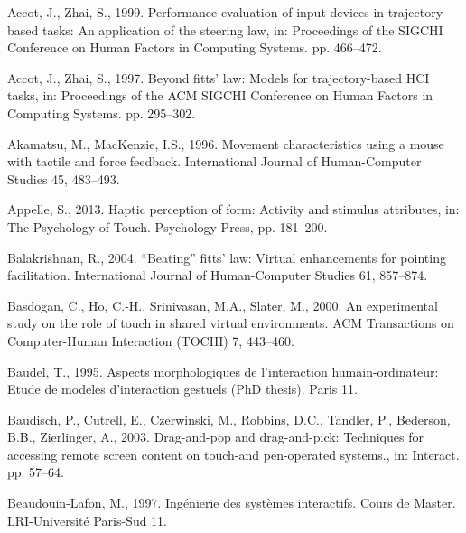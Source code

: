 \documentclass[
]{book}
\newlength{\cslhangindent}
\newlength{\cslentryspacingunit} %
\newenvironment{CSLReferences}[2] %
 {%
  \setlength{\parindent}{0pt}
  \ifodd #1
  \let\oldpar\par
  \def\par{\hangindent=\cslhangindent\oldpar}
  \fi
  \setlength{\parskip}{#2\cslentryspacingunit}
 }%
 {}
\begin{document}
\hypertarget{refs}{}
\begin{CSLReferences}{1}{0}
\leavevmode{}%
Accot, J., Zhai, S., 1999. Performance evaluation of input devices in trajectory-based tasks: An application of the steering law, in: Proceedings of the SIGCHI Conference on Human Factors in Computing Systems. pp. 466--472.

\leavevmode{}%
Accot, J., Zhai, S., 1997. Beyond fitts' law: Models for trajectory-based HCI tasks, in: Proceedings of the ACM SIGCHI Conference on Human Factors in Computing Systems. pp. 295--302.

\leavevmode{}%
Akamatsu, M., MacKenzie, I.S., 1996. Movement characteristics using a mouse with tactile and force feedback. International Journal of Human-Computer Studies 45, 483--493.

\leavevmode{}%
Appelle, S., 2013. Haptic perception of form: Activity and stimulus attributes, in: The Psychology of Touch. Psychology Press, pp. 181--200.

\leavevmode{}%
Balakrishnan, R., 2004. {``Beating''} fitts' law: Virtual enhancements for pointing facilitation. International Journal of Human-Computer Studies 61, 857--874.

\leavevmode{}%
Basdogan, C., Ho, C.-H., Srinivasan, M.A., Slater, M., 2000. An experimental study on the role of touch in shared virtual environments. ACM Transactions on Computer-Human Interaction (TOCHI) 7, 443--460.

\leavevmode{}%
Baudel, T., 1995. Aspects morphologiques de l'interaction humain-ordinateur: Etude de modeles d'interaction gestuels (PhD thesis). Paris 11.

\leavevmode{}%
Baudisch, P., Cutrell, E., Czerwinski, M., Robbins, D.C., Tandler, P., Bederson, B.B., Zierlinger, A., 2003. Drag-and-pop and drag-and-pick: Techniques for accessing remote screen content on touch-and pen-operated systems., in: Interact. pp. 57--64.

\leavevmode{}%
Beaudouin-Lafon, M., 1997. Ing{é}nierie des syst{è}mes interactifs. Cours de Master. LRI-Universit{é} Paris-Sud 11.


\end{CSLReferences}
\end{document}
